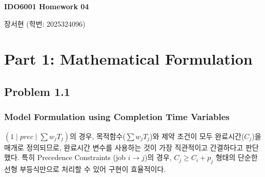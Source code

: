 \documentclass[10pt]{article}
\begin{document}
\begin{center}
    {\LARGE\bfseries IDO6001 Homework 04 \par}
    \vspace{1em}
    {\large 장서현 (학번: 2025324096) \par}
\end{center}
\vspace{0.5em}

\section*{Part 1: Mathematical Formulation}

\subsection*{Problem 1.1 }

\subsubsection*{Model Formulation using Completion Time Variables}
$(1 \mid prec \mid \sum w_j T_j)$의 경우, 목적함수($\sum w_j T_j$)와 제약 조건이 모두 완료시간($C_j$)을 매개로 정의되므로, 완료시간 변수를 사용하는 것이 가장 직관적이고 간결하다고 판단했다. 특히 Precedence Constraints (job $i \to j$)의 경우, $C_j \ge C_i + p_j$ 형태의 단순한 선형 부등식만으로 처리할 수 있어 구현이 효율적이다. 
\vspace{0.5em}
\end{document}
